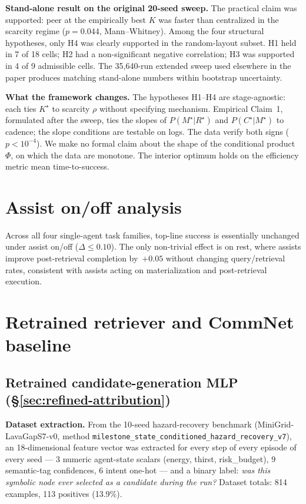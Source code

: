 \documentclass{article}
\begin{document}
\textbf{Stand-alone result on the original 20-seed sweep.}
The practical claim was supported: peer at the empirically best $K$ was faster than centralized in the scarcity regime ($p = 0.044$, Mann--Whitney). Among the four structural hypotheses, only H4 was clearly supported in the random-layout subset. H1 held in 7 of 18 cells; H2 had a non-significant negative correlation; H3 was supported in 4 of 9 admissible cells. The 35{,}640-run extended sweep used elsewhere in the paper produces matching stand-alone numbers within bootstrap uncertainty.

\textbf{What the framework changes.}
The hypotheses H1--H4 are stage-agnostic: each ties $K^\star$ to scarcity $\rho$ without specifying mechanism. Empirical Claim~1, formulated after the sweep, ties the slopes of $P(M^\star|R^\star)$ and $P(C^\star|M^\star)$ to cadence; the slope conditions are testable on logs. The data verify both signs ($p<10^{-4}$). We make no formal claim about the shape of the conditional product $\Phi$, on which the data are monotone. The interior optimum holds on the efficiency metric mean time-to-success.

\section{Assist on/off analysis}
\label{app:assist}

Across all four single-agent task families, top-line success is essentially unchanged under assist on/off ($\Delta \le 0.10$). The only non-trivial effect is on rest, where assists improve post-retrieval completion by~$+0.05$ without changing query/retrieval rates, consistent with assists acting on materialization and post-retrieval execution.

\section{Retrained retriever and CommNet baseline}
\label{app:learned-baselines}

\subsection{Retrained candidate-generation MLP (\S\ref{sec:refined-attribution})}

\textbf{Dataset extraction.} From the 10-seed hazard-recovery benchmark
(MiniGrid-LavaGapS7-v0, method \texttt{milestone\_state\_conditioned\_hazard\_recovery\_v7}),
an 18-dimensional feature vector was extracted for every step of every episode of every seed --- 3 numeric agent-state scalars (energy, thirst, risk\_budget),
9 semantic-tag confidences, 6 intent one-hot --- and a binary label: \emph{was
this symbolic node ever selected as a candidate during the run?} Dataset
totals: 814 examples, 113 positives (13.9\%).
\end{document}
